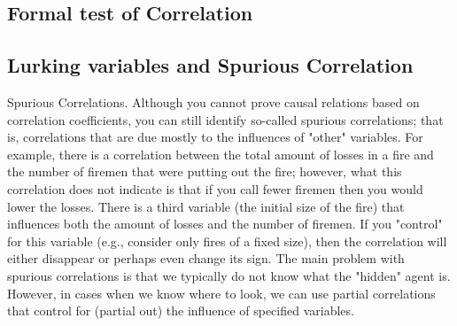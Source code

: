 \subsection{Formal test of Correlation}
\subsection{Lurking variables and Spurious Correlation}
Spurious Correlations. Although you cannot prove causal relations based on correlation coefficients, you can still identify so-called spurious correlations; that is, correlations that are due mostly to the influences of "other" variables. For example, there is a correlation between the total amount of losses in a fire and the number of firemen that were putting out the fire; however, what this correlation does not indicate is that if you call fewer firemen then you would lower the losses. There is a third variable (the initial size of the fire) that influences both the amount of losses and the number of firemen. If you "control" for this variable (e.g., consider only fires of a fixed size), then the correlation will either disappear or perhaps even change its sign. The main problem with spurious correlations is that we typically do not know what the "hidden" agent is. However, in cases when we know where to look, we can use partial correlations that control for (partial out) the influence of specified variables.



